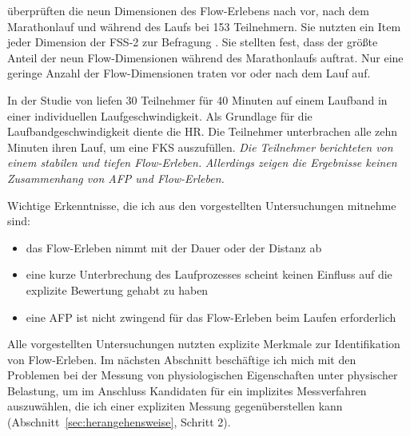 \citet{Jimenez-Torres2013} überprüften die neun Dimensionen des Flow-Erlebens nach \citet{Csikszentmihalyi1992} vor, nach dem Marathonlauf und während des Laufs bei 153 Teilnehmern. Sie nutzten ein Item jeder Dimension der \ac{FSS}-2 zur Befragung \citep{Jackson2002}. Sie stellten fest, dass der größte Anteil der neun Flow-Dimensionen während des Marathonlaufs auftrat. Nur eine geringe Anzahl der Flow-Dimensionen traten vor oder nach dem Lauf auf. 

In der Studie von \citet{Reinhardt2006} liefen 30 Teilnehmer für 40 Minuten auf einem Laufband in einer individuellen Laufgeschwindigkeit. Als Grundlage für die Laufbandgeschwindigkeit diente die HR. Die Teilnehmer unterbrachen alle zehn Minuten ihren Lauf, um eine \ac{FKS} auszufüllen. \emph{Die Teilnehmer berichteten von einem stabilen und tiefen Flow-Erleben.} \emph{Allerdings zeigen die Ergebnisse keinen Zusammenhang von \ac{AFP} und Flow-Erleben.}

Wichtige Erkenntnisse, die ich aus den vorgestellten Untersuchungen mitnehme sind:
\begin{itemize}
	
	\item das Flow-Erleben nimmt mit der Dauer oder der Distanz ab
	
	\item eine kurze Unterbrechung des Laufprozesses scheint keinen Einfluss auf die explizite Bewertung gehabt zu haben
	
	\item eine \ac{AFP} ist nicht zwingend für das Flow-Erleben beim Laufen erforderlich
\end{itemize}

Alle vorgestellten Untersuchungen nutzten explizite Merkmale zur Identifikation von Flow-Erleben. Im nächsten Abschnitt beschäftige ich mich mit den Problemen bei der Messung von physiologischen Eigenschaften unter physischer Belastung, um im Anschluss Kandidaten für ein implizites Messverfahren auszuwählen, die ich einer expliziten Messung gegenüberstellen kann (Abschnitt~\ref{sec:herangehensweise}, Schritt 2). 

